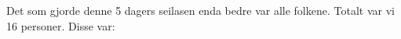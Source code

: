 \begin{figure}[p]
	\vspace*{-2.7cm}
\end{figure}


%


Det som gjorde denne 5 dagers seilasen enda bedre var alle folkene.
Totalt var vi 16 personer. Disse var: 

